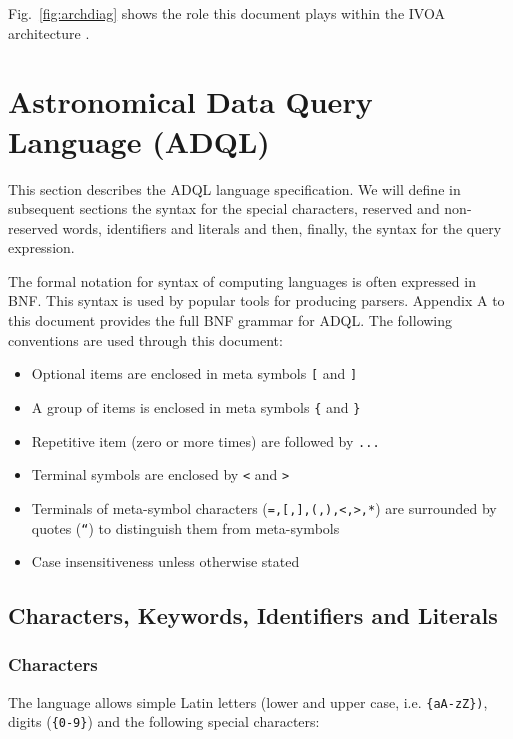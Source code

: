 \documentclass[11pt,a4paper]{ivoa}
\begin{document}
Fig.~\ref{fig:archdiag} shows the role this document plays within the
IVOA architecture \citep{note:VOARCH}.

\clearpage
\section{Astronomical Data Query Language (ADQL)}
\label{sec:language}

This section describes the ADQL language specification. We will define in
subsequent sections the syntax for the special characters, reserved and non-
reserved words, identifiers and literals and then, finally, the syntax for
the query expression.

The formal notation for syntax of computing languages is often expressed
in BNF. This syntax is used by popular tools for
producing parsers. Appendix A to this document provides the full BNF grammar
for ADQL. The following conventions are used through this document:

\begin{itemize}
    \item Optional items are enclosed in meta symbols \verb:[: and \verb:]:
    \item A group of items is enclosed in meta symbols \verb:{: and \verb:}:
    \item Repetitive item (zero or more times) are followed by \verb:...:
    \item Terminal symbols are enclosed by \verb:<: and \verb:>:
    \item Terminals of meta-symbol characters (\verb:=,[,],(,),<,>,*:) are surrounded by quotes (\verb:“:) to distinguish them from meta-symbols
    \item Case insensitiveness unless otherwise stated
\end{itemize}

\clearpage
\subsection{Characters, Keywords, Identifiers and Literals}
\subsubsection{Characters}
\label{sec:characters}

The language allows simple Latin letters (lower and upper case, i.e.
\verb:{aA-zZ}):, digits (\verb:{0-9}:) and the following special characters:
\end{document}
